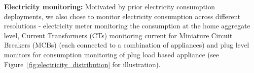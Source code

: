 \documentclass[10pt]{sensys-proc}
\newcommand{\figref}[1]{Figure~\ref{#1}}
\begin{document}
\noindent\textbf{Electricity monitoring:} %
Motivated by prior electricity consumption deployments, we also chose to monitor electricity consumption across different resolutions - electricity meter monitoring the consumption at the home aggregate level, Current Transformers (CTs) monitoring current for Miniature Circuit Breakers (MCBs) (each connected to a combination of appliances) and plug level monitors for consumption monitoring of plug load based appliance (see \figref{fig:electricity_distribution} for illustration). 
\end{document}
